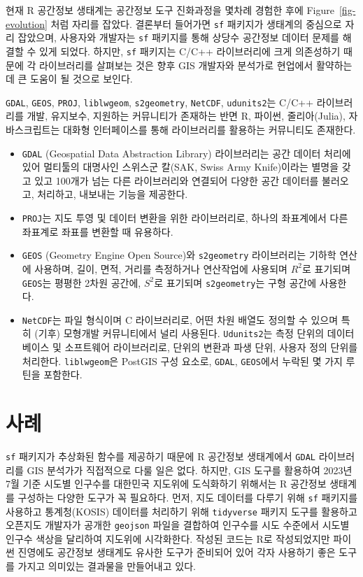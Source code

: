 \documentclass[
  a4paper,showtrims,openright,hidelinks]{oblivoir}
\providecommand{\tightlist}{%
  \setlength{\itemsep}{0pt}\setlength{\parskip}{0pt}}\usepackage{longtable,booktabs,array}
\begin{document}
현재 R 공간정보 생태계는 공간정보 도구 진화과정을 몇차례 경험한 후에
Figure~\ref{fig-evolution} 처럼 자리를 잡았다. 결론부터 들어가면
\texttt{sf} 패키지가 생태계의 중심으로 자리 잡았으며, 사용자와 개발자는
\texttt{sf} 패키지를 통해 상당수 공간정보 데이터 문제를 해결할 수 있게
되었다. 하지만, \texttt{sf} 패키지는 C/C++ 라이브러리에 크게 의존성하기
때문에 각 라이브러리를 살펴보는 것은 향후 GIS 개발자와 분석가로 현업에서
활약하는데 큰 도움이 될 것으로 보인다.

\texttt{GDAL}, \texttt{GEOS}, \texttt{PROJ}, \texttt{liblwgeom},
\texttt{s2geometry}, \texttt{NetCDF}, \texttt{udunits2}는 C/C++
라이브러리를 개발, 유지보수, 지원하는 커뮤니티가 존재하는 반면 R,
파이썬, 줄리아(Julia), 자바스크립트는 대화형 인터페이스를 통해
라이브러리를 활용하는 커뮤니티도 존재한다. \autocite{sds}

\begin{itemize}
\tightlist
\item
  \texttt{GDAL} (Geospatial Data Abstraction Library) 라이브러리는 공간
  데이터 처리에 있어 멀티툴의 대명사인 스위스군 칼(SAK, Swiss Army
  Knife)이라는 별명을 갖고 있고 100개가 넘는 다른 라이브러리와 연결되어
  다양한 공간 데이터를 불러오고, 처리하고, 내보내는 기능을 제공한다.
\item
  \texttt{PROJ}는 지도 투영 및 데이터 변환을 위한 라이브러리로, 하나의
  좌표계에서 다른 좌표계로 좌표를 변환할 때 유용하다.
\item
  \texttt{GEOS} (Geometry Engine Open Source)와 \texttt{s2geometry}
  라이브러리는 기하학 연산에 사용하며, 길이, 면적, 거리를 측정하거나
  연산작업에 사용되며 \(R^2\)로 표기되며 \texttt{GEOS}는 평평한 2차원
  공간에, \(S^2\)로 표기되며 \texttt{s2geometry}는 구형 공간에 사용한다.
\item
  \texttt{NetCDF}는 파일 형식이며 C 라이브러리로, 어떤 차원 배열도
  정의할 수 있으며 특히 (기후) 모형개발 커뮤니티에서 널리 사용된다.
  \texttt{Udunits2}는 측정 단위의 데이터베이스 및 소프트웨어
  라이브러리로, 단위의 변환과 파생 단위, 사용자 정의 단위를 처리한다.
  \texttt{liblwgeom}은 PostGIS 구성 요소로, \texttt{GDAL},
  \texttt{GEOS}에서 누락된 몇 가지 루틴을 포함한다.
  \autocite{Pebesma2016}
\end{itemize}

\hypertarget{uxc0acuxb840}{%
\section{사례}\label{uxc0acuxb840}}

\texttt{sf} 패키지가 추상화된 함수를 제공하기 때문에 R 공간정보
생태계에서 \texttt{GDAL} 라이브러리를 GIS 분석가가 직접적으로 다룰 일은
없다. 하지만, GIS 도구를 활용하여 2023년 7월 기준 시도별 인구수를
대한민국 지도위에 도식화하기 위해서는 R 공간정보 생태계를 구성하는
다양한 도구가 꼭 필요하다. 먼저, 지도 데이터를 다루기 위해 \texttt{sf}
패키지를 사용하고 통계청(KOSIS) 데이터를 처리하기 위해
\texttt{tidyverse} 패키지 도구를 활용하고 오픈지도 개발자가 공개한
\texttt{geojson} 파일을 결합하여 인구수를 시도 수준에서 시도별 인구수
색상을 달리하여 지도위에 시각화한다. 작성된 코드는 R로 작성되었지만
파이썬 진영에도 공간정보 생태계도 유사한 도구가 준비되어 있어 각자
사용하기 좋은 도구를 가지고 의미있는 결과물을 만들어내고
있다.\autocite{wickham2019welcome}
\end{document}
